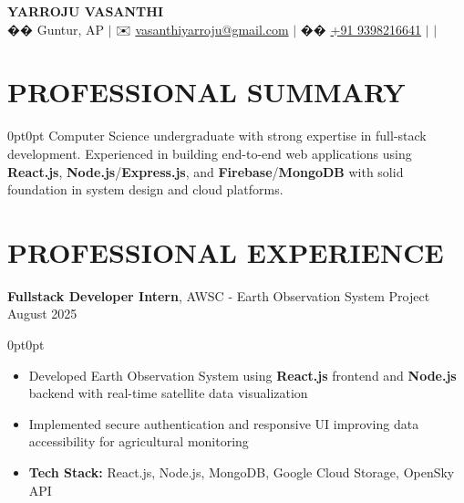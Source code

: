 \documentclass[9pt,letterpaper]{article}
\newenvironment{onecolentry}{\begin{adjustwidth}{0pt}{0pt}}{\end{adjustwidth}}
\newenvironment{highlights}{
    \begin{itemize}[
        topsep=0.05cm,
        parsep=0.05cm,
        partopsep=0pt,
        itemsep=0pt,
        leftmargin=8pt
    ]
}{\end{itemize}}
\newcommand{\contactsep}{\kern 4pt $|$ \kern 4pt}
\begin{document}
\begin{center}
    {\fontsize{22pt}{22pt}\selectfont \textbf{YARROJU VASANTHI}}\\[4pt]
    \normalsize
    �� Guntur, AP \contactsep
    ✉️ \href{mailto:vasanthiyarroju@gmail.com}{vasanthiyarroju@gmail.com} \contactsep
    �� \href{tel:+919398216641}{+91 9398216641} \contactsep
    \href{https://linkedin.com/in/vasanthi-yarroju}{\faLinkedin} \contactsep
    \href{https://github.com/Vasanthi-Yarroju}{\faGithub}
\end{center}

\vspace{-0.2cm}

\section{PROFESSIONAL SUMMARY}
\begin{onecolentry}
Computer Science undergraduate with strong expertise in full-stack development. Experienced in building end-to-end web applications using \textbf{React.js}, \textbf{Node.js}/\textbf{Express.js}, and \textbf{Firebase}/\textbf{MongoDB} with solid foundation in system design and cloud platforms.
\end{onecolentry}

\section{PROFESSIONAL EXPERIENCE}

\noindent
\textbf{Fullstack Developer Intern}, AWSC - Earth Observation System Project \href{https://github.com/VasanthiYarroju/Earth_Observation_System}{\faGithub} \hfill August 2025
\vspace{0.05cm}
\begin{onecolentry}
\begin{highlights}
    \item Developed Earth Observation System using \textbf{React.js} frontend and \textbf{Node.js} backend with real-time satellite data visualization
    \item Implemented secure authentication and responsive UI improving data accessibility for agricultural monitoring
    \item \textbf{Tech Stack:} React.js, Node.js, MongoDB, Google Cloud Storage, OpenSky API
\end{highlights}
\end{onecolentry}

\vspace{0.1cm}
\end{document}
